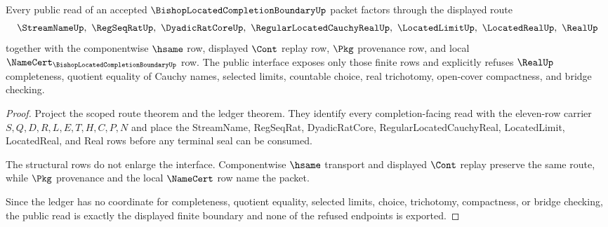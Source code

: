 \begin{theorem}
\label{thm:bishop-located-completion-boundary-public-interface}
Every public read of an accepted $\BishopLocatedCompletionBoundaryUp$ packet factors through the displayed route
$$
\StreamNameUp,\ \RegSeqRatUp,\ \DyadicRatCoreUp,\ \RegularLocatedCauchyRealUp,\ \LocatedLimitUp,\ \LocatedRealUp,\ \RealUp
$$
together with the componentwise $\hsame$ row, displayed $\Cont$ replay row, $\Pkg$ provenance row, and local $\NameCert_{\BishopLocatedCompletionBoundaryUp}$ row. The public interface exposes only those finite rows and explicitly refuses $\RealUp$ completeness, quotient equality of Cauchy names, selected limits, countable choice, real trichotomy, open-cover compactness, and bridge checking.
\end{theorem}
\begin{proof}
Project the scoped route theorem and the ledger theorem. They identify every completion-facing read with the eleven-row carrier $S,Q,D,R,L,E,T,H,C,P,N$ and place the StreamName, RegSeqRat, DyadicRatCore, RegularLocatedCauchyReal, LocatedLimit, LocatedReal, and Real rows before any terminal seal can be consumed.

The structural rows do not enlarge the interface. Componentwise $\hsame$ transport and displayed $\Cont$ replay preserve the same route, while $\Pkg$ provenance and the local $\NameCert$ row name the packet.

Since the ledger has no coordinate for completeness, quotient equality, selected limits, choice, trichotomy, compactness, or bridge checking, the public read is exactly the displayed finite boundary and none of the refused endpoints is exported.
\end{proof}

